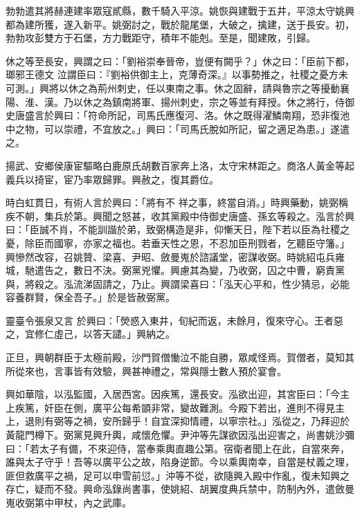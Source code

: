 \begin{pinyinscope}
 勃勃遣其將赫連建率眾寇貳縣，數千騎入平涼。姚恢與建戰于五井，平涼太守姚興都為建所獲，遂入新平。姚弼討之，戰於龍尾堡，大破之，擒建，送于長安。初，勃勃攻彭雙方于石堡，方力戰距守，積年不能剋。至是，聞建敗，引歸。



 休之等至長安，興謂之曰：「劉裕崇奉晉帝，豈便有闕乎？」休之曰：「臣前下都，瑯邪王德文
 泣謂臣曰：『劉裕供御主上，克薄奇深。』以事勢推之，社稷之憂方未可測。」興將以休之為荊州刺史，任以東南之事。休之固辭，請與魯宗之等擾動襄陽、淮、漢。乃以休之為鎮南將軍、揚州刺史，宗之等並有拜授。休之將行，侍御史唐盛言於興曰：「符命所記，司馬氏應復河、洛。休之既得濯鱗南翔，恐非復池中之物，可以崇禮，不宜放之。」興曰：「司馬氏脫如所記，留之適足為患。」遂遣之。



 揚武、安鄉侯康宦驅略白鹿原氏胡數百家奔上洛，太守宋林距之。商洛人黃金等起義兵以掎宦，宦乃率眾歸罪。興赦之，復其爵位。



 時白虹貫日，有術人言於興曰：「將有不
 祥之事，終當自消。」時興藥動，姚弼稱疾不朝，集兵於第。興聞之怒甚，收其黨殿中侍御史唐盛、孫玄等殺之。泓言於興曰：「臣誠不肖，不能訓諧於弟，致弼構造是非，仰慚天日，陛下若以臣為社稷之憂，除臣而國寧，亦家之福也。若垂天性之恩，不忍加臣刑戮者，乞聽臣守籓。」興慘然改容，召姚贊、梁喜、尹昭、斂曼嵬於諮議堂，密謀收弼。時姚紹屯兵雍城，馳遣告之，數日不決。弼黨兇懼。興慮其為變，乃收弼，囚之中曹，窮責黨與，將殺之。泓流涕固請之，乃止。興謂梁喜曰：「泓天心平和，性少猜忌，必能容養群賢，保全吾子。」於是皆赦弼黨。



 靈臺令張泉又言
 於興曰：「熒惑入東井，旬紀而返，未餘月，復來守心。王者惡之，宜修仁虛己，以答天譴。」興納之。



 正旦，興朝群臣于太極前殿，沙門賀僧慟泣不能自勝，眾咸怪焉。賀僧者，莫知其所從來也，言事皆有效驗，興甚神禮之，常與隱士數人預於宴會。



 興如華陰，以泓監國，入居西宮。因疾篤，還長安。泓欲出迎，其宮臣曰：「今主上疾篤，奸臣在側，廣平公每希顗非常，變故難測。今殿下若出，進則不得見主上，退則有弼等之禍，安所歸乎！自宜深抑情禮，以寧宗社。」泓從之，乃拜迎於黃龍門樽下。弼黨見興升輿，咸懷危懼。尹沖等先謀欲因泓出迎害之，尚書姚沙彌
 曰：「若太子有備，不來迎侍，當奉乘輿直趣公第。宿衛者聞上在此，自當來奔，誰與太子守乎！吾等以廣平公之故，陷身逆節。今以乘輿南幸，自當是杖義之理，匪但救廣平之禍，足可以申雪前愆。」沖等不從，欲隨興入殿中作亂，復未知興之存亡，疑而不發。興命泓錄尚書事，使姚紹、胡翼度典兵禁中，防制內外，遣斂曼嵬收弼第中甲杖，內之武庫。




\end{pinyinscope}
